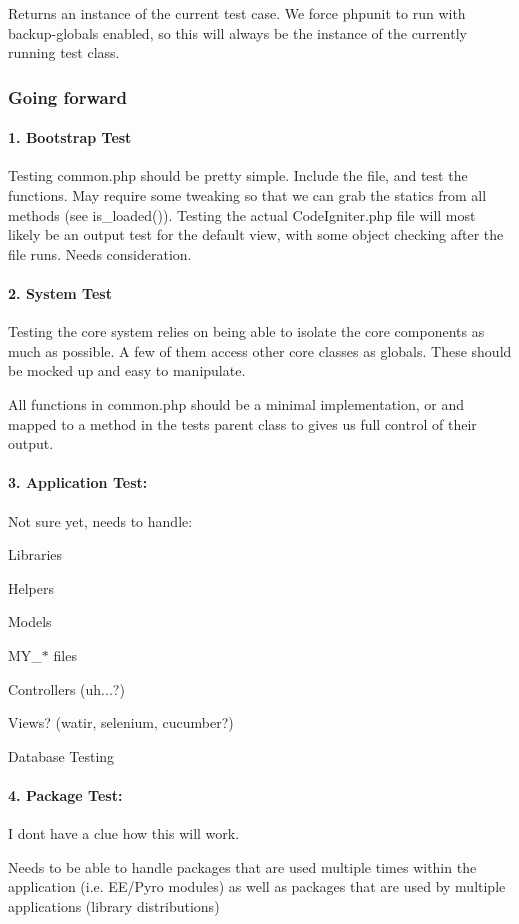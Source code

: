 Returns an instance of the current test case. We force phpunit to run with backup-\/globals enabled, so this will always be the instance of the currently running test class.

\subsubsection*{Going forward}

\paragraph*{1. Bootstrap Test}

Testing common.\+php should be pretty simple. Include the file, and test the functions. May require some tweaking so that we can grab the statics from all methods (see is\+\_\+loaded()). Testing the actual Code\+Igniter.\+php file will most likely be an output test for the default view, with some object checking after the file runs. Needs consideration.

\paragraph*{2. System Test}

Testing the core system relies on being able to isolate the core components as much as possible. A few of them access other core classes as globals. These should be mocked up and easy to manipulate.

All functions in common.\+php should be a minimal implementation, or and mapped to a method in the test\textquotesingle{}s parent class to gives us full control of their output.

\paragraph*{3. Application Test\+:}

Not sure yet, needs to handle\+:


\begin{DoxyItemize}
\item Libraries
\item Helpers
\item Models
\item M\+Y\+\_\+$\ast$ files
\item Controllers (uh...?)
\item Views? (watir, selenium, cucumber?)
\item Database Testing
\end{DoxyItemize}

\paragraph*{4. Package Test\+:}

I don\textquotesingle{}t have a clue how this will work.

Needs to be able to handle packages that are used multiple times within the application (i.\+e. E\+E/\+Pyro modules) as well as packages that are used by multiple applications (library distributions) 